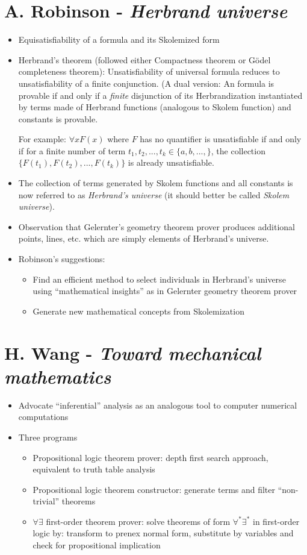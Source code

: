 \documentclass{article}
\begin{document}
\section{A. Robinson - \emph{Herbrand universe}}

\begin{itemize}
\item Equisatisfiability of a formula and its Skolemized form
\item Herbrand's theorem (followed either Compactness theorem or G\"odel completeness theorem): Unsatisfiability of universal formula reduces to unsatisfiability of a finite conjunction. (A dual version: An formula is provable if and only if a \emph{finite} disjunction of its Herbrandization instantiated by terms made of Herbrand functions (analogous to Skolem function) and constants is provable.

For example: $\forall x F(x)$ where $F$ has no quantifier is unsatisfiable if and only if for a finite number of term $t_1, t_2, ..., t_k \in \{a, b, ..., \}$, the collection $\{F(t_1), F(t_2), ..., F(t_k)\}$ is already unsatisfiable.
\item The collection of terms generated by Skolem functions and all constants is now referred to as \emph{Herbrand's universe}  (it should better be called \emph{Skolem universe}).
\item Observation that Gelernter's geometry theorem prover produces additional points, lines, etc. which are simply elements of Herbrand's universe.
\item Robinson's suggestions:
\begin{itemize}
\item Find an efficient method to select individuals in Herbrand's universe using ``mathematical insights'' as in Gelernter geometry theorem prover
\item Generate new mathematical concepts from Skolemization
\end{itemize}
\end{itemize}

\section{H. Wang - \emph{Toward mechanical mathematics}}

\begin{itemize}
\item Advocate ``inferential'' analysis as an analogous tool to computer numerical computations
\item Three programs
\begin{itemize}
\item Propositional logic theorem prover: depth first search approach, equivalent to truth table analysis
\item Propositional logic theorem constructor: generate terms and filter ``non-trivial'' theorems
\item $\forall \exists$ first-order theorem prover: solve theorems of form $\forall^{*} \exists^{*}$ in first-order logic by: transform to prenex normal form, substitute by variables and check for propositional implication
\end{itemize}
\end{itemize}
\end{document}
